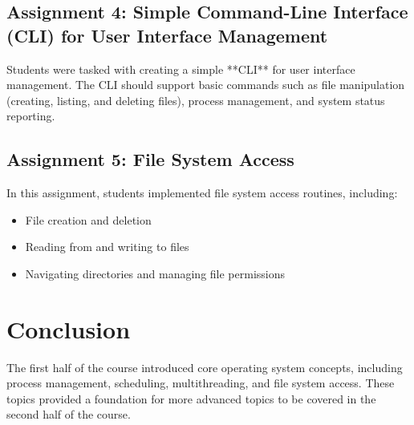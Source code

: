 \documentclass[12pt]{article}
\begin{document}
\subsection{Assignment 4: Simple Command-Line Interface (CLI) for User Interface Management}
Students were tasked with creating a simple **CLI** for user interface management. The CLI should support basic commands such as file manipulation (creating, listing, and deleting files), process management, and system status reporting.

\subsection{Assignment 5: File System Access}
In this assignment, students implemented file system access routines, including:
\begin{itemize}
    \item File creation and deletion
    \item Reading from and writing to files
    \item Navigating directories and managing file permissions
\end{itemize}

\section{Conclusion}
The first half of the course introduced core operating system concepts, including process management, scheduling, multithreading, and file system access. These topics provided a foundation for more advanced topics to be covered in the second half of the course.

\newpage %
\printbibliography{} %
\end{document}
